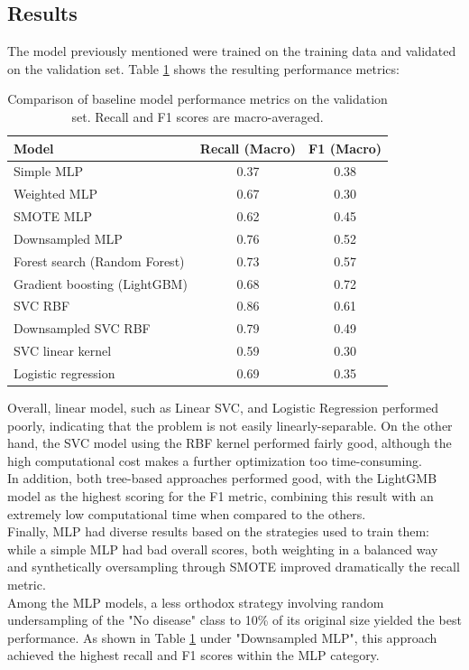\documentclass[a4paper,12pt]{article}
\begin{document}
\subsection*{Results}
The model previously mentioned were trained on the training data and validated on the validation set. Table \ref{tab:model_comparison} shows the resulting performance metrics:
\begin{table}[htbp]
    \centering
    \caption{Comparison of baseline model performance metrics on the validation set. Recall and F1 scores are macro-averaged.}
    \label{tab:model_comparison}
    \begin{tabular}{lcc}
        \toprule
        \textbf{Model} & \textbf{Recall (Macro)} & \textbf{F1 (Macro)} \\
        \midrule
        Simple MLP & 0.37 & 0.38 \\
        Weighted MLP & 0.67 & 0.30 \\
        SMOTE MLP & 0.62 & 0.45 \\
        Downsampled MLP & 0.76 & 0.52 \\
        Forest search (Random Forest) & 0.73 & 0.57 \\
        Gradient boosting (LightGBM) & 0.68 & 0.72 \\
        SVC RBF & 0.86 & 0.61 \\
        Downsampled SVC RBF  & 0.79 & 0.49 \\
        SVC linear kernel & 0.59 & 0.30 \\
        Logistic regression & 0.69 & 0.35 \\
        \bottomrule
    \end{tabular}
\end{table}
\newpage
Overall, linear model, such as Linear SVC, and Logistic Regression performed poorly, indicating that the problem is not easily linearly-separable. On the other hand, the SVC model using the RBF kernel performed fairly good, although the high computational cost makes a further optimization too time-consuming.\\In addition, both tree-based approaches performed good, with the LightGMB model as the highest scoring for the F1 metric, combining this result with an extremely low computational time when compared to the others. \\
Finally, MLP had diverse results based on the strategies used to train them: while a simple MLP had bad overall scores, both weighting in a balanced way and synthetically oversampling through SMOTE improved dramatically the recall metric. \\Among the MLP models, a less orthodox strategy involving random undersampling of the "No disease" class to 10\% of its original size yielded the best performance. As shown in Table \ref{tab:model_comparison} under "Downsampled MLP", this approach achieved the highest recall and F1 scores within the MLP category.
\\\\
\end{document}
